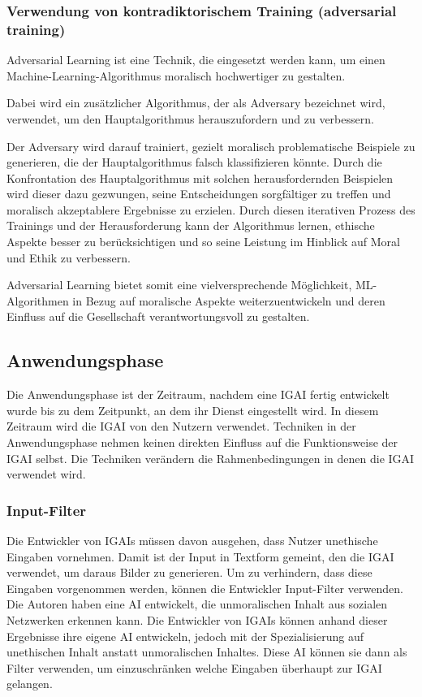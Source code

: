 \documentclass[12pt]{article}
\begin{document}
\subsubsection{Verwendung von kontradiktorischem Training (adversarial training)}
Adversarial Learning ist eine Technik, die eingesetzt werden kann, um einen Machine-Learning-Algorithmus moralisch hochwertiger zu gestalten. 

Dabei wird ein zusätzlicher Algorithmus, der als Adversary bezeichnet wird, verwendet, um den Hauptalgorithmus herauszufordern und zu verbessern. 

Der Adversary wird darauf trainiert, gezielt moralisch problematische Beispiele zu generieren, die der Hauptalgorithmus falsch klassifizieren könnte. 
Durch die Konfrontation des Hauptalgorithmus mit solchen herausfordernden Beispielen wird dieser dazu gezwungen, seine Entscheidungen sorgfältiger zu treffen und moralisch akzeptablere Ergebnisse zu erzielen. Durch diesen iterativen Prozess des Trainings und der Herausforderung kann der Algorithmus lernen, ethische Aspekte besser zu berücksichtigen und so seine Leistung im Hinblick auf Moral und Ethik zu verbessern. 

Adversarial Learning bietet somit eine vielversprechende Möglichkeit, ML-Algorithmen in Bezug auf moralische Aspekte weiterzuentwickeln und deren Einfluss auf die Gesellschaft verantwortungsvoll zu gestalten.


\subsection{Anwendungsphase}
Die Anwendungsphase ist der Zeitraum, nachdem eine IGAI fertig entwickelt wurde bis zu dem Zeitpunkt, an dem ihr Dienst eingestellt wird. In diesem Zeitraum wird die IGAI von den Nutzern verwendet. Techniken in der Anwendungsphase nehmen keinen direkten Einfluss auf die Funktionsweise der IGAI selbst. Die Techniken verändern die Rahmenbedingungen in denen die IGAI verwendet wird.

\subsubsection{Input-Filter}
Die Entwickler von IGAIs müssen davon ausgehen, dass Nutzer unethische Eingaben vornehmen. Damit ist der Input in Textform gemeint, den die IGAI verwendet, um daraus Bilder zu generieren. Um zu verhindern, dass diese Eingaben vorgenommen werden, können die Entwickler Input-Filter verwenden. Die Autoren \cite{Shah} haben eine AI entwickelt, die unmoralischen Inhalt aus sozialen Netzwerken erkennen kann. Die Entwickler von IGAIs können anhand dieser Ergebnisse ihre eigene AI entwickeln, jedoch mit der Spezialisierung auf unethischen Inhalt anstatt unmoralischen Inhaltes. Diese AI können sie dann als Filter verwenden, um einzuschränken welche Eingaben überhaupt zur IGAI gelangen.
\end{document}
